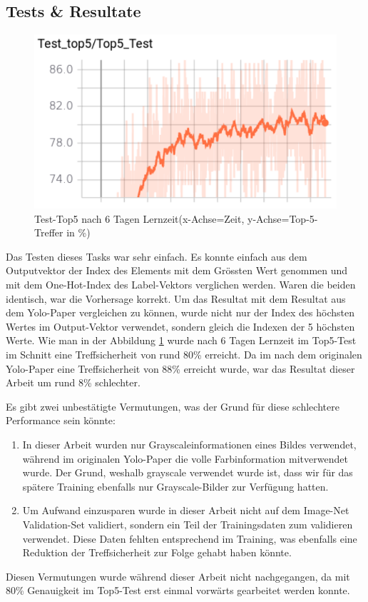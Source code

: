 \subsection{Tests \& Resultate}
\begin{figure}	
	\centering
	\includegraphics[width=.7\textwidth]{Kapitel/20Pretraining/Bilder/Test_top5.pdf}
	\caption{Test-Top5 nach 6 Tagen Lernzeit(x-Achse=Zeit, y-Achse=Top-5-Treffer in \%)}
	\label{img:test_top5}
\end{figure}   
Das Testen dieses Tasks war sehr einfach.
Es konnte einfach aus dem Outputvektor der Index des Elements mit dem Grössten Wert genommen und mit dem One-Hot-Index des Label-Vektors verglichen werden. 
Waren die beiden identisch, war die Vorhersage korrekt. 
Um das Resultat mit dem Resultat aus dem Yolo-Paper \cite{yolo} vergleichen zu können, wurde nicht nur der Index des höchsten Wertes im Output-Vektor verwendet, sondern gleich die Indexen der 5 höchsten Werte. 
Wie man in der Abbildung \ref{img:test_top5} wurde nach 6 Tagen Lernzeit im Top5-Test im Schnitt eine Treffsicherheit von rund 80\% erreicht.
Da im nach dem originalen Yolo-Paper \cite{yolo} eine Treffsicherheit von 88\% erreicht wurde, war das Resultat dieser Arbeit um rund 8\% schlechter.

Es gibt zwei unbestätigte Vermutungen, was der Grund für diese schlechtere Performance sein könnte: 
\begin{enumerate}
\item In dieser Arbeit wurden nur Grayscaleinformationen eines Bildes verwendet, während im originalen Yolo-Paper \cite{yolo} die volle Farbinformation mitverwendet wurde. Der Grund, weshalb grayscale verwendet wurde ist, dass wir für das spätere Training ebenfalls nur Grayscale-Bilder zur Verfügung hatten.
\item Um Aufwand einzusparen wurde in dieser Arbeit nicht auf dem Image-Net Validation-Set validiert, sondern ein Teil der Trainingsdaten zum validieren verwendet. Diese Daten fehlten entsprechend im Training, was ebenfalls eine Reduktion der Treffsicherheit zur Folge gehabt haben könnte. 
\end{enumerate}
Diesen Vermutungen wurde während dieser Arbeit nicht nachgegangen, da mit 80\% Genauigkeit im Top5-Test erst einmal vorwärts gearbeitet werden konnte. 



